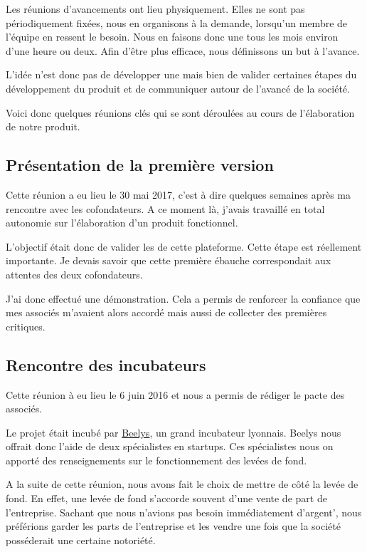 \documentclass[]{report}
\begin{document}
    Les réunions d'avancements ont lieu physiquement. Elles ne sont pas périodiquement fixées, nous en organisons à la demande, lorsqu'un membre de l'équipe en ressent le besoin. Nous en faisons donc une tous les mois environ d'une heure ou deux. Afin d'être plus efficace, nous définissons un but à l'avance.

    L'idée n'est donc pas de développer une  mais bien de valider certaines étapes du développement du produit et de communiquer autour de l'avancé de la société.

    Voici donc quelques réunions clés qui se sont déroulées au cours de l'élaboration de notre produit.

    \subsection{Présentation de la première version}

      Cette réunion a eu lieu le 30 mai 2017, c'est à dire quelques semaines après ma rencontre avec les cofondateurs. A ce moment là, j'avais travaillé en total autonomie sur l'élaboration d'un produit fonctionnel.

      L'objectif était donc de valider les  de cette plateforme. Cette étape est réellement importante. Je devais savoir que cette première ébauche correspondait aux attentes des deux cofondateurs.

      J'ai donc effectué une démonstration. Cela a permis de renforcer la confiance que mes associés m'avaient alors accordé mais aussi de collecter des premières critiques.

    \subsection{Rencontre des incubateurs}

      Cette réunion à eu lieu le 6 juin 2016 et nous a permis de rédiger le pacte des associés.

      Le projet était incubé par \href{https://www.beelys.org/}{Beelys}, un grand incubateur lyonnais. Beelys nous offrait donc l'aide de deux spécialistes en startups. Ces spécialistes nous on apporté des renseignements sur le fonctionnement des levées de fond.

      A la suite de cette réunion, nous avons fait le choix de mettre de côté la levée de fond. En effet, une levée de fond s'accorde souvent d'une vente de part de l'entreprise. Sachant que nous n'avions pas besoin immédiatement d'argent', nous préférions garder les parts de l'entreprise et les vendre une fois que la société posséderait une certaine notoriété.
\end{document}
